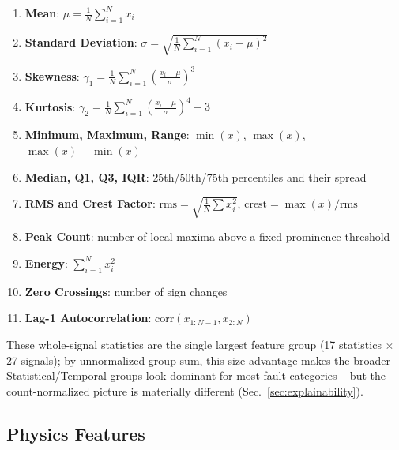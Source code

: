 \begin{enumerate}
    \item \textbf{Mean}: $\mu = \frac{1}{N}\sum_{i=1}^{N} x_i$  %
    \item \textbf{Standard Deviation}: $\sigma = \sqrt{\frac{1}{N}\sum_{i=1}^{N} (x_i - \mu)^2}$  %
    \item \textbf{Skewness}: $\gamma_1 = \frac{1}{N}\sum_{i=1}^{N} \left(\frac{x_i - \mu}{\sigma}\right)^3$  %
    \item \textbf{Kurtosis}: $\gamma_2 = \frac{1}{N}\sum_{i=1}^{N} \left(\frac{x_i - \mu}{\sigma}\right)^4 - 3$  %
    \item \textbf{Minimum, Maximum, Range}: $\min(x)$, $\max(x)$, $\max(x)-\min(x)$
    \item \textbf{Median, Q1, Q3, IQR}: 25th/50th/75th percentiles and their spread  %
    \item \textbf{RMS and Crest Factor}: $\text{rms} = \sqrt{\frac{1}{N}\sum x_i^2}$, $\text{crest} = \max(x)/\text{rms}$  %
    \item \textbf{Peak Count}: number of local maxima above a fixed prominence threshold
    \item \textbf{Energy}: $\sum_{i=1}^{N} x_i^2$  %
    \item \textbf{Zero Crossings}: number of sign changes
    \item \textbf{Lag-1 Autocorrelation}: $\text{corr}(x_{1:N-1}, x_{2:N})$  %
\end{enumerate}

These whole-signal statistics are the single largest feature group (17 statistics $\times$ 27 signals); %
by unnormalized group-sum, this size advantage makes the broader Statistical/Temporal groups look dominant for most fault categories -- but the count-normalized picture is materially different (Sec.~\ref{sec:explainability}).

\subsection{Physics Features}

